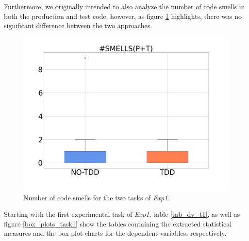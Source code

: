 Furthermore, we originally intended to also analyze the number of code smells in both the production and test code, however, as figure \ref{bp_task1_2_smells} highlights, there was no significant difference between the two approaches.

\begin{figure}[H]
    \centering
    \includegraphics[width=0.5\linewidth, scale=0.5]{figures/box_plots/SMELLS.png}
    \caption{Number of code smells for the two tasks of \textit{Exp1}.}
    \label{bp_task1_2_smells}
\end{figure}


Starting with the first experimental task of \textit{Exp1}, table \ref{tab_dv_t1}, as well as figure \ref{box_plots_task1} show the tables containing the extracted statistical measures and the box plot charts for the dependent variables, respectively.

